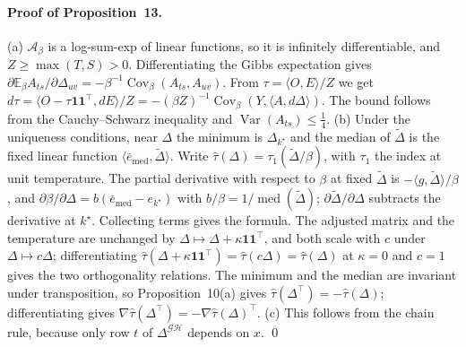 \documentclass[12pt]{article}
\begin{document}
\paragraph{Proof of Proposition~13.}
(a) $\mathcal A_\beta$ is a log-sum-exp of linear functions, so it is infinitely differentiable, and $Z\ge\max(T,S)>0$. Differentiating the Gibbs expectation gives $\partial\mathbb E_\beta A_{ts}/\partial\Delta_{uv}=-\beta^{-1}\operatorname{Cov}_\beta(A_{ts},A_{uv})$. From $\tau=\langle O,E\rangle/Z$ we get $d\tau=\langle O-\tau\mathbf 1\mathbf 1^\top,dE\rangle/Z=-(\beta Z)^{-1}\operatorname{Cov}_\beta(Y,\langle A,d\Delta\rangle)$. The bound follows from the Cauchy--Schwarz inequality and $\operatorname{Var}(A_{ts})\le\frac14$.
(b) Under the uniqueness conditions, near $\Delta$ the minimum is $\Delta_{k^\star}$ and the median of $\tilde\Delta$ is the fixed linear function $\langle\bar e_{\mathrm{med}},\tilde\Delta\rangle$. Write $\hat\tau(\Delta)=\tau_1(\tilde\Delta/\beta)$, with $\tau_1$ the index at unit temperature. The partial derivative with respect to $\beta$ at fixed $\tilde\Delta$ is $-\langle g,\tilde\Delta\rangle/\beta$, and $\partial\beta/\partial\Delta=b(\bar e_{\mathrm{med}}-e_{k^\star})$ with $b/\beta=1/\operatorname{med}(\tilde\Delta)$; $\partial\tilde\Delta/\partial\Delta$ subtracts the derivative at $k^\star$. Collecting terms gives the formula. The adjusted matrix and the temperature are unchanged by $\Delta\mapsto\Delta+\kappa\mathbf 1\mathbf 1^\top$, and both scale with $c$ under $\Delta\mapsto c\Delta$; differentiating $\hat\tau(\Delta+\kappa\mathbf 1\mathbf 1^\top)=\hat\tau(c\Delta)=\hat\tau(\Delta)$ at $\kappa=0$ and $c=1$ gives the two orthogonality relations. The minimum and the median are invariant under transposition, so Proposition~10(a) gives $\hat\tau(\Delta^\top)=-\hat\tau(\Delta)$; differentiating gives $\nabla\hat\tau(\Delta^\top)=-\nabla\hat\tau(\Delta)^\top$.
(c) This follows from the chain rule, because only row $t$ of $\Delta^{\mathcal{GH}}$ depends on $x$. \qed
\end{document}
